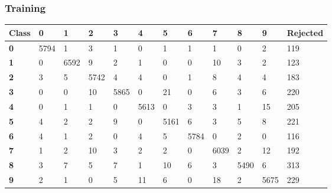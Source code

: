 \documentclass[
  a4paper,            %
  DIV=10,             %
  oneside,            %
  BCOR=5mm,           %
  parskip=half,       %
  numbers=noenddot,   %
  bibtotoc,           %
  listof=totoc,        %
  article
]{scrreprt}
\begin{document}
\subsubsection{Training}
\begin{center}
  \centering
  \begin{tabular}{|p{1cm}|p{1cm}|p{1cm}|p{1cm}|p{1cm}|p{1cm}|p{1cm}|p{1cm}|p{1cm}|p{1cm}|p{1cm}|p{1.7cm}|}
    \hline
    \textbf{Class} & \textbf{0} & \textbf{1} & \textbf{2} & \textbf{3} & \textbf{4} & \textbf{5} & \textbf{6} & \textbf{7} & \textbf{8} & \textbf{9} & \textbf{Rejected} \\
    \hline
    \textbf{0} & 5794 & 1 & 3 & 1 & 0 & 1 & 1 & 1 & 0 & 2 & 119 \\
    \hline
    \textbf{1} & 0 & 6592 & 9 & 2 & 1 & 0 & 0 & 10 & 3 & 2 & 123 \\
    \hline
    \textbf{2} & 3 & 5 & 5742 & 4 & 4 & 0 & 1 & 8 & 4 & 4 & 183 \\
    \hline
    \textbf{3} & 0 & 0 & 10 & 5865 & 0 & 21 & 0 & 6 & 3 & 6 & 220 \\
    \hline
    \textbf{4} & 0 & 1 & 1 & 0 & 5613 & 0 & 3 & 3 & 1 & 15 & 205 \\
    \hline
    \textbf{5} & 4 & 2 & 2 & 9 & 0 & 5161 & 6 & 3 & 5 & 8 & 221 \\
    \hline
    \textbf{6} & 4 & 1 & 2 & 0 & 4 & 5 & 5784 & 0 & 2 & 0 & 116 \\
    \hline
    \textbf{7} & 1 & 2 & 10 & 3 & 2 & 2 & 0 & 6039 & 2 & 12 & 192 \\
    \hline
    \textbf{8} & 3 & 7 & 5 & 7 & 1 & 10 & 6 & 3 & 5490 & 6 & 313 \\
    \hline
    \textbf{9} & 2 & 1 & 0 & 5 & 11 & 6 & 0 & 18 & 2 & 5675 & 229 \\
    \hline
  \end{tabular}
\end{center}
\end{document}
